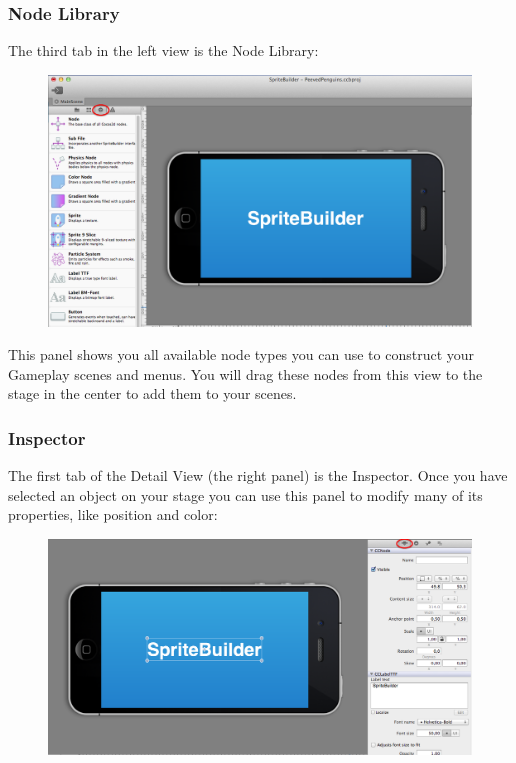 \subsubsection{Node Library}
The third tab in the left view is the {Node Library}:
\begin{figure}[H]
		\centering
		\includegraphics[width=0.8\linewidth]{images/spritebuilder/spritebuilder_nodeview.png}     
\end{figure} 
This panel shows you all available node types you can use to construct your
Gameplay scenes and menus. You will drag these nodes from this view to the stage
in the center to add them to your scenes.

\subsubsection{Inspector}
The first tab of the Detail View (the right panel) is
the Inspector. Once you have selected an object on your stage you can use this panel to modify many of its properties, like position and color:
\begin{figure}[H]
		\centering
		\includegraphics[width=0.8\linewidth]{images/spritebuilder/spritebuilder_inspector.png}     
\end{figure} 

